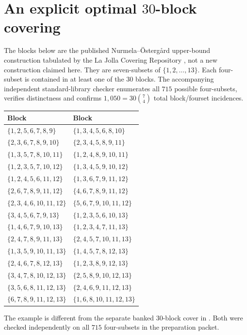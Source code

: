 \documentclass[11pt]{article}
\newcommand{\bin}[2]{\binom{#1}{#2}}
\theoremstyle{definition}
\theoremstyle{remark}
\begin{document}
\section[An explicit optimal 30-block covering]{An explicit optimal $30$-block covering}\label{app:cover}
The blocks below are the published Nurmela--\"Osterg\r{a}rd
upper-bound construction tabulated by the La Jolla Covering Repository
\cite{LJCR}, not a new construction claimed here. They are seven-subsets
of $\{1,2,\ldots,13\}$. Each four-subset is contained in at least one
of the $30$ blocks. The
accompanying independent standard-library checker enumerates all
$715$ possible four-subsets, verifies distinctness and confirms
$1{,}050=30\bin{7}{4}$ total block/fourset incidences.
\begin{center}
\begingroup\footnotesize\setlength{\tabcolsep}{6pt}
\begin{tabular}{@{}ll@{}}
\toprule
Block & Block\\
\midrule
$\{1,2,5,6,7,8,9\}$ & $\{1,3,4,5,6,8,10\}$\\
$\{2,3,6,7,8,9,10\}$ & $\{2,3,4,5,8,9,11\}$\\
$\{1,3,5,7,8,10,11\}$ & $\{1,2,4,8,9,10,11\}$\\
$\{1,2,3,5,7,10,12\}$ & $\{1,3,4,5,9,10,12\}$\\
$\{1,2,4,5,6,11,12\}$ & $\{1,3,6,7,9,11,12\}$\\
$\{2,6,7,8,9,11,12\}$ & $\{4,6,7,8,9,11,12\}$\\
$\{2,3,4,6,10,11,12\}$ & $\{5,6,7,9,10,11,12\}$\\
$\{3,4,5,6,7,9,13\}$ & $\{1,2,3,5,6,10,13\}$\\
$\{1,4,6,7,9,10,13\}$ & $\{1,2,3,4,7,11,13\}$\\
$\{2,4,7,8,9,11,13\}$ & $\{2,4,5,7,10,11,13\}$\\
$\{1,3,5,9,10,11,13\}$ & $\{1,4,5,7,8,12,13\}$\\
$\{2,4,6,7,8,12,13\}$ & $\{1,2,3,8,9,12,13\}$\\
$\{3,4,7,8,10,12,13\}$ & $\{2,5,8,9,10,12,13\}$\\
$\{3,5,6,8,11,12,13\}$ & $\{2,4,6,9,11,12,13\}$\\
$\{6,7,8,9,11,12,13\}$ & $\{1,6,8,10,11,12,13\}$\\
\bottomrule
\end{tabular}
\endgroup
\end{center}
The example is different from the separate banked $30$-block cover in
. Both were checked independently on all $715$
four-subsets in the preparation packet.
\end{document}
